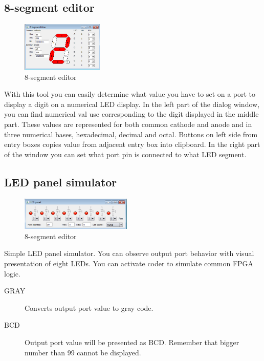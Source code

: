 \subsection{8-segment editor}
    \begin{figure}
        \centering{}
        \includegraphics[width=110pt]{img/8segment.png}
        \caption{8-segment editor}
    \end{figure}
    With this tool you can easily determine what value you have to set on a port to display a digit on a numerical LED display. In the left part of the dialog window, you can find numerical val use corresponding to the digit displayed in the middle part. These values are represented for both common cathode and anode and in three numerical bases, hexadecimal, decimal and octal. Buttons on left side from entry boxes copies value from adjacent entry box into clipboard. In the right part of the window you can set what port pin is connected to what LED segment.

\subsection{LED panel simulator}
    \begin{figure}
        \centering{}
        \includegraphics[width=150pt]{img/Led_panel.png}
        \caption{8-segment editor}
    \end{figure}
    Simple LED panel simulator. You can observe output port behavior with visual presentation of eight LEDs. You can activate coder to simulate common FPGA logic.

    \begin{description}
        \item[GRAY] Converts output port value to gray code.
        \item[BCD] Output port value will be presented as BCD. Remember that bigger number than 99 cannot be displayed.
    \end{description}

